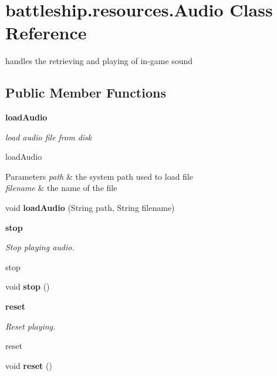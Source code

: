 \hypertarget{classbattleship_1_1resources_1_1Audio}{}\section{battleship.\+resources.\+Audio Class Reference}
\label{classbattleship_1_1resources_1_1Audio}


handles the retrieving and playing of in-\/game sound  


\subsection*{Public Member Functions}
\begin{Indent}{\bf load\+Audio}\par
{\em load audio file from disk

load\+Audio


\begin{DoxyParams}{Parameters}
{\em path} & the system path used to load file \\
\hline
{\em filename} & the name of the file \\
\hline
\end{DoxyParams}
}\begin{DoxyCompactItemize}
\item 
\hypertarget{classbattleship_1_1resources_1_1Audio_a97561d31a3314ba0c7b1696a74ab54c6}{}void {\bfseries load\+Audio} (String path, String filename)\label{classbattleship_1_1resources_1_1Audio_a97561d31a3314ba0c7b1696a74ab54c6}

\end{DoxyCompactItemize}
\end{Indent}
\begin{Indent}{\bf stop}\par
{\em Stop playing audio.

stop }\begin{DoxyCompactItemize}
\item 
\hypertarget{classbattleship_1_1resources_1_1Audio_aeda87b321180f98d0302aa1ca1a9efce}{}void {\bfseries stop} ()\label{classbattleship_1_1resources_1_1Audio_aeda87b321180f98d0302aa1ca1a9efce}

\end{DoxyCompactItemize}
\end{Indent}
\begin{Indent}{\bf reset}\par
{\em Reset playing.

reset }\begin{DoxyCompactItemize}
\item 
\hypertarget{classbattleship_1_1resources_1_1Audio_a9bb2fc46ad3b07c275366c1f71f89482}{}void {\bfseries reset} ()\label{classbattleship_1_1resources_1_1Audio_a9bb2fc46ad3b07c275366c1f71f89482}

\end{DoxyCompactItemize}
\end{Indent}
